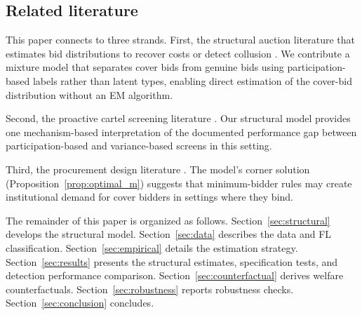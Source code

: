 \subsection{Related literature}

This paper connects to three strands. First, the structural auction
literature that estimates bid distributions to recover costs or detect
collusion \citep{guerre2000optimal, bajari2003deciding,
porter1993detection, pesendorfer2000study}. We contribute a mixture
model that separates cover bids from genuine bids using
participation-based labels rather than latent types, enabling direct
estimation of the cover-bid distribution without an EM algorithm.

Second, the proactive cartel screening literature
\citep{harrington2008detecting, imhof2019detecting,
huber2019machine}. Our structural model provides one mechanism-based
interpretation of the documented performance gap between
participation-based and variance-based screens in this setting.

Third, the procurement design literature
\citep{szymanski2006impact, decarolis2018buyers}. The model's corner solution
(Proposition~\ref{prop:optimal_m}) suggests that minimum-bidder
rules may create institutional demand for cover bidders in settings
where they bind.

The remainder of this paper is organized as follows.
Section~\ref{sec:structural} develops the structural model.
Section~\ref{sec:data} describes the data and FL classification.
Section~\ref{sec:empirical} details the estimation strategy.
Section~\ref{sec:results} presents the structural estimates,
specification tests, and detection performance comparison.
Section~\ref{sec:counterfactual} derives welfare counterfactuals.
Section~\ref{sec:robustness} reports robustness checks.
Section~\ref{sec:conclusion} concludes.
